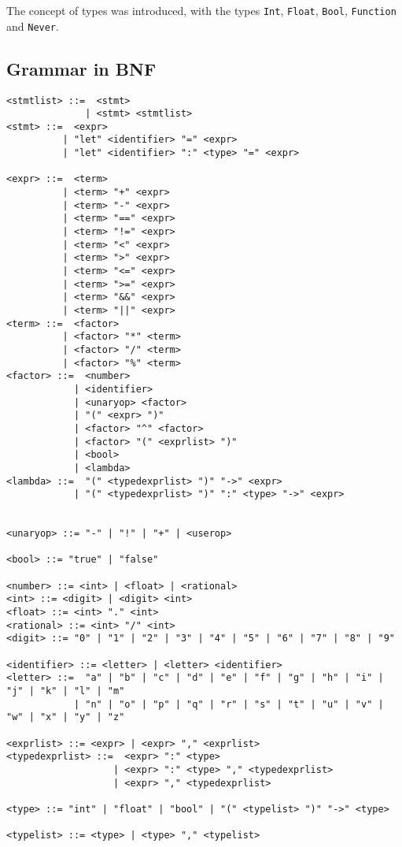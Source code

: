 The concept of types was introduced, with the types \texttt{Int}, \texttt{Float}, \texttt{Bool}, \texttt{Function} and
\texttt{Never}.

\subsection{Grammar in BNF}\label{subsec:grammar-in-bnf5}

\begin{verbatim}
<stmtlist> ::=  <stmt> 
              | <stmt> <stmtlist>
<stmt> ::=  <expr> 
          | "let" <identifier> "=" <expr>
          | "let" <identifier> ":" <type> "=" <expr>

<expr> ::=  <term> 
          | <term> "+" <expr> 
          | <term> "-" <expr>
          | <term> "==" <expr>
          | <term> "!=" <expr>
          | <term> "<" <expr>
          | <term> ">" <expr>
          | <term> "<=" <expr>
          | <term> ">=" <expr>
          | <term> "&&" <expr>
          | <term> "||" <expr>
<term> ::=  <factor> 
          | <factor> "*" <term> 
          | <factor> "/" <term> 
          | <factor> "%" <term> 
<factor> ::=  <number> 
            | <identifier> 
            | <unaryop> <factor>
            | "(" <expr> ")" 
            | <factor> "^" <factor>
            | <factor> "(" <exprlist> ")"
            | <bool>
            | <lambda>
<lambda> ::=  "(" <typedexprlist> ")" "->" <expr>
            | "(" <typedexprlist> ")" ":" <type> "->" <expr>


<unaryop> ::= "-" | "!" | "+" | <userop>

<bool> ::= "true" | "false"
            
<number> ::= <int> | <float> | <rational>
<int> ::= <digit> | <digit> <int>
<float> ::= <int> "." <int>
<rational> ::= <int> "/" <int>
<digit> ::= "0" | "1" | "2" | "3" | "4" | "5" | "6" | "7" | "8" | "9"

<identifier> ::= <letter> | <letter> <identifier>
<letter> ::=  "a" | "b" | "c" | "d" | "e" | "f" | "g" | "h" | "i" | "j" | "k" | "l" | "m" 
            | "n" | "o" | "p" | "q" | "r" | "s" | "t" | "u" | "v" | "w" | "x" | "y" | "z"
            
<exprlist> ::= <expr> | <expr> "," <exprlist>
<typedexprlist> ::=  <expr> ":" <type> 
                   | <expr> ":" <type> "," <typedexprlist>
                   | <expr> "," <typedexprlist>
    
<type> ::= "int" | "float" | "bool" | "(" <typelist> ")" "->" <type>

<typelist> ::= <type> | <type> "," <typelist>
\end{verbatim}


